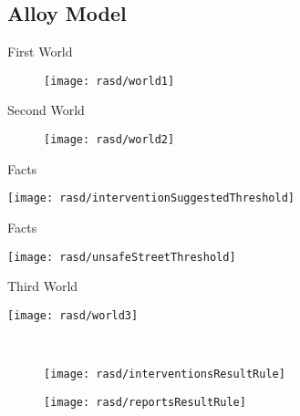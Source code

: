 	\subsection{Alloy Model}
		\begin{frame}{First World}

			\begin{figure}[hbtp]
				\centering
				\hspace*{-0.9cm}
				\vspace*{2.5cm}
				\texttt{[image: rasd/world1]}
			\end{figure}
		\end{frame}
	
		\begin{frame}{Second World}
			\vspace*{-1.5cm}
			\begin{figure}
				\centering
				\texttt{[image: rasd/world2]}
			\end{figure}
		\end{frame}
	
		\begin{frame}{Facts}
			\hspace{0.5cm}
			\begin{minipage}{0.4\textwidth}
				\centering
				\texttt{[image: rasd/interventionSuggestedThreshold]}
			\end{minipage}
		\end{frame}

		\begin{frame}{Facts}
			\hspace{-0.7cm}
			\begin{minipage}{0.4\textwidth}
				\centering
				\texttt{[image: rasd/unsafeStreetThreshold]}
			\end{minipage}
		\end{frame}
	
		\begin{frame}{Third World}
			\begin{minipage}{0.3\textwidth}
				\centering
				\texttt{[image: rasd/world3]}
			\end{minipage}\hspace{0.5cm}
			~
			\begin{minipage}{0.4\textwidth}
				\centering
				\begin{figure}
					\vspace{-10pt}
					\centering
					\texttt{[image: rasd/interventionsResultRule]}
				\end{figure}

				\begin{figure}
					\vspace{-0.8cm}
					\centering
					\texttt{[image: rasd/reportsResultRule]}
				\end{figure}
			\end{minipage}
		\end{frame}
	
